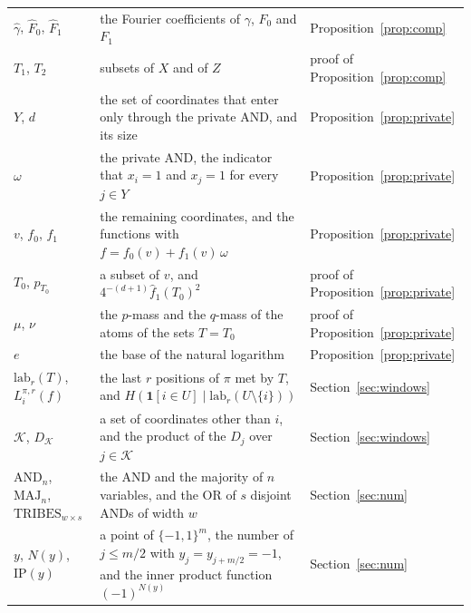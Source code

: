 \documentclass[11pt]{amsart}
\theoremstyle{remark}
\newcommand{\lab}{\mathrm{lab}}
\begin{document}
\begin{longtable}{@{}>{\raggedright\arraybackslash}p{}>{\raggedright\arraybackslash}p{}>{\raggedright\arraybackslash}p{}@{}}
$\hat\gamma$, $\hat F_0$, $\hat F_1$ & the Fourier coefficients of $\gamma$, $F_0$ and $F_1$ & Proposition~\ref{prop:comp} \\
$T_1$, $T_2$ & subsets of $X$ and of $Z$ & proof of Proposition~\ref{prop:comp} \\
$Y$, $d$ & the set of coordinates that enter only through the private AND, and its size & Proposition~\ref{prop:private} \\
$\omega$ & the private AND, the indicator that $x_i=1$ and $x_j=1$ for every $j\in Y$ & Proposition~\ref{prop:private} \\
$v$, $f_0$, $f_1$ & the remaining coordinates, and the functions with $f=f_0(v)+f_1(v)\,\omega$ & Proposition~\ref{prop:private} \\
$T_0$, $p_{T_0}$ & a subset of $v$, and $4^{-(d+1)}\hat f_1(T_0)^2$ & proof of Proposition~\ref{prop:private} \\
$\mu$, $\nu$ & the $p$-mass and the $q$-mass of the atoms of the sets $T=T_0$ & proof of Proposition~\ref{prop:private} \\
$e$ & the base of the natural logarithm & Proposition~\ref{prop:private} \\
$\lab_r(T)$, $L^{\pi,r}_i(f)$ & the last $r$ positions of $\pi$ met by $T$, and $H(\mathbf 1[i\in U]\mid\lab_r(U\setminus\{i\}))$ & Section~\ref{sec:windows} \\
$\mathcal K$, $D_{\mathcal K}$ & a set of coordinates other than $i$, and the product of the $D_j$ over $j\in\mathcal K$ & Section~\ref{sec:windows} \\
$\mathrm{AND}_n$, $\mathrm{MAJ}_n$, $\mathrm{TRIBES}_{w\times s}$ & the AND and the majority of $n$ variables, and the OR of $s$ disjoint ANDs of width $w$ & Section~\ref{sec:num} \\
$y$, $N(y)$, $\mathrm{IP}(y)$ & a point of $\{-1,1\}^m$, the number of $j\le m/2$ with $y_j=y_{j+m/2}=-1$, and the inner product function $(-1)^{N(y)}$ & Section~\ref{sec:num} \\
\bottomrule
\end{longtable}
\end{document}
